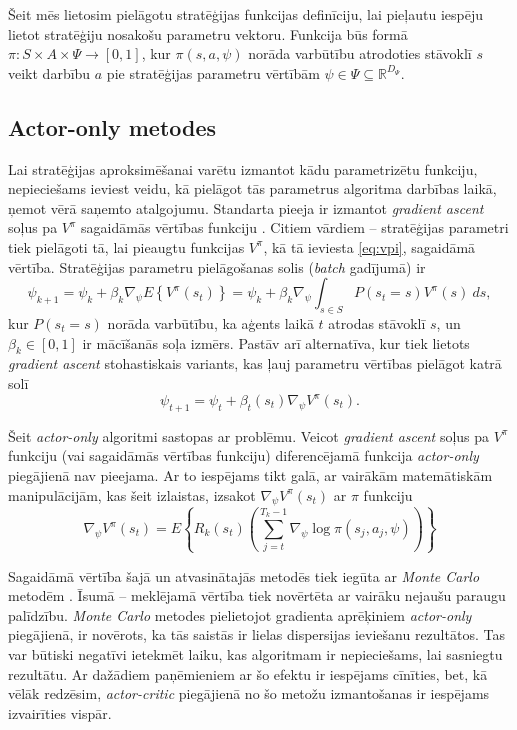 \documentclass{ludis} %
\begin{document}
Šeit mēs lietosim pielāgotu stratēģijas funkcijas definīciju, lai pieļautu
iespēju lietot stratēģiju nosakošu parametru vektoru. Funkcija būs formā $\pi: S
\times A \times \Psi \rightarrow [0,1]$, kur $\pi(s, a, \psi)$ norāda varbūtību
atrodoties stāvoklī $s$ veikt darbību $a$ pie stratēģijas parametru vērtībām
$\psi \in \Psi \subseteq \mathbb{R}^{D_\Psi}$.

\subsection{Actor-only metodes}
 
Lai stratēģijas aproksimēšanai varētu izmantot kādu parametrizētu funkciju,
nepieciešams ieviest veidu, kā pielāgot tās parametrus algoritma darbības laikā,
ņemot vērā saņemto atalgojumu. Standarta pieeja ir izmantot \textit{gradient
  ascent} soļus pa $V^\pi$ sagaidāmās vērtības funkciju
\autocite{williams1992simple} \autocite{sutton2000policy}
\autocite{Hasselt2012}. Citiem vārdiem -- stratēģijas parametri tiek pielāgoti
tā, lai pieaugtu funkcijas $V^\pi$, kā tā ieviesta \eqref{eq:vpi}, sagaidāmā
vērtība. Stratēģijas parametru pielāgošanas solis (\textit{batch} gadījumā) ir
\[
	\psi_{k+1} = \psi_k + \beta_k \nabla_\psi E \left\{V^\pi(s_t)\right\} =
  \psi_k + \beta_k \nabla_\psi \int_{s \in S} P(s_t = s) V^\pi(s)\ ds,
\]
kur $P(s_t = s)$ norāda varbūtību, ka aģents laikā $t$ atrodas stāvoklī $s$, un
$\beta_k \in [0,1]$ ir mācīšanās soļa izmērs. Pastāv arī alternatīva, kur tiek
lietots \textit{gradient ascent} stohastiskais variants, kas ļauj parametru
vērtības pielāgot katrā solī
\begin{equation} \label{eq:stohgrad}
	\psi_{t+1} = \psi_t + \beta_t(s_t) \nabla_\psi V^\pi(s_t).
\end{equation}

Šeit \textit{actor-only} algoritmi sastopas ar problēmu. Veicot \textit{gradient
  ascent} soļus pa $V^\pi$ funkciju (vai sagaidāmās vērtības funkciju)
diferencējamā funkcija \textit{actor-only} piegājienā nav pieejama. Ar to
iespējams tikt galā, ar vairākām matemātiskām manipulācijām, kas šeit izlaistas,
izsakot $\nabla_\psi V^\pi(s_t)$ ar $\pi$ funkciju
\begin{equation} \label{eq:nablav}
	\nabla_\psi V^\pi(s_t) = E \left\{R_k(s_t)
    \left(\sum\limits_{j=t}^{T_k - 1} \nabla_\psi \log \pi(s_j, a_j, \psi) \right)
  \right\}
\end{equation}

Sagaidāmā vērtība šajā un atvasinātajās metodēs tiek iegūta ar \textit{Monte
  Carlo} metodēm \autocite{halton1970retrospective}. Īsumā -- meklējamā vērtība
tiek novērtēta ar vairāku nejaušu paraugu palīdzību. \textit{Monte Carlo}
metodes pielietojot gradienta aprēķiniem \textit{actor-only} piegājienā, ir
novērots, ka tās saistās ir lielas dispersijas ieviešanu rezultātos. Tas var
būtiski negatīvi ietekmēt laiku, kas algoritmam ir nepieciešams, lai sasniegtu
rezultātu. Ar dažādiem paņēmieniem ar šo efektu ir iespējams cīnīties, bet, kā
vēlāk redzēsim, \textit{actor-critic} piegājienā no šo metožu izmantošanas ir
iespējams izvairīties vispār. %
\end{document}
